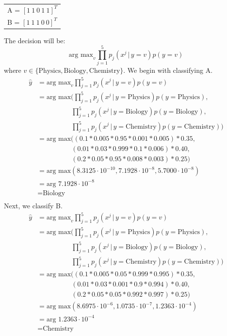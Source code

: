 \documentclass[12pt]{article}
\begin{document}
	\begin{center}
		\begin{tabular*}{250pt}[t]{l}
			A = $[1 \ 1 \ 0 \ 1 \ 1]^T$ \\
			B = $[1 \ 1 \ 1 \ 0 \ 0]^T$ \\
		\end{tabular*}
	\end{center}
	The decision will be:
	\begin{equation*}
	\text{arg max}_{v} \prod_{j=1}^{5} p_{j}(x^{j} \, \vert \, y=v) p(y = v)
	\end{equation*}
	where $v \in \lbrace {\text{Physics}, \text{Biology}, \text{Chemistry}}\rbrace$. We begin with classifying A.
	\begin{align*}
	\hat{y} &= \text{arg max}_{v} \prod_{j=1}^{5} p_{j}(x^{j} \, \vert \, y=v) p(y = v) \\
	&= \text{arg max} ( \prod_{j=1}^{5} p_{j}(x^{j} \, \vert \, y=\text{Physics}) p(y = \text{Physics}), \\
	& \qquad\qquad\quad \prod_{j=1}^{5} p_{j}(x^{j} \, \vert \, y=\text{Biology}) p(y = \text{Biology}), \\
	& \qquad \qquad \quad \prod_{j=1}^{5} p_{j}(x^{j} \, \vert \, y=\text{Chemistry}) p(y = \text{Chemistry}) ) \\
	&= \text{arg max} ((0.1*0.005*0.95*0.001*0.005)*0.35,\\
	&\qquad\qquad\quad (0.01*0.03*0.999*0.1*0.006)*0.40,\\
	&\qquad\qquad\quad (0.2*0.05*0.95*0.008*0.003)*0.25) \\
	&= \text{arg max} (8.3125 \cdot 10^{-10}, 7.1928 \cdot 10^{-8},5.7000 \cdot 10^{-8}) \\
	&= \text{arg } 7.1928 \cdot 10^{-8} \\
	&= \text{Biology} \\
	\end{align*}
	Next, we classify B.
	\begin{align*}
	\hat{y} &= \text{arg max}_{v} \prod_{j=1}^{5} p_{j}(x^{j} \, \vert \, y=v) p(y = v) \\
	&= \text{arg max} ( \prod_{j=1}^{5} p_{j}(x^{j} \, \vert \, y=\text{Physics}) p(y = \text{Physics}), \\
	& \qquad\qquad\quad \prod_{j=1}^{5} p_{j}(x^{j} \, \vert \, y=\text{Biology}) p(y = \text{Biology}), \\
	& \qquad \qquad \quad \prod_{j=1}^{5} p_{j}(x^{j} \, \vert \, y=\text{Chemistry}) p(y = \text{Chemistry}) ) \\
	&= \text{arg max} ((0.1*0.005*0.05*0.999*0.995) * 0.35,\\
	&\qquad\qquad\quad (0.01*0.03*0.001*0.9*0.994)*0.40,\\
	&\qquad\qquad\quad (0.2*0.05*0.05*0.992*0.997)*0.25) \\
	&= \text{arg max} (8.6975 \cdot 10^{-6}, 1.0735 \cdot 10^{-7}, 1.2363 \cdot 10^{-4}) \\
	&= \text{arg } 1.2363 \cdot 10^{-4} \\
	&= \text{Chemistry} \\
	\end{align*}
	
\end{document}
